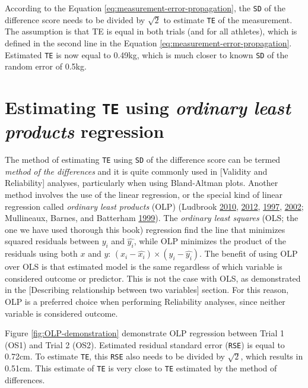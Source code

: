 \documentclass[
]{book}
\begin{document}
According to the Equation \eqref{eq:measurement-error-propagation}, the \texttt{SD} of the difference score needs to be divided by \(\sqrt{2}\) to estimate \texttt{TE} of the measurement. The assumption is that TE is equal in both trials (and for all athletes), which is defined in the second line in the Equation \eqref{eq:measurement-error-propagation}. Estimated \texttt{TE} is now equal to 0.49kg, which is much closer to known \texttt{SD} of the random error of 0.5kg.

\hypertarget{estimating-te-using-ordinary-least-products-regression}{%
\section{\texorpdfstring{Estimating \texttt{TE} using \emph{ordinary least products} regression}{Estimating TE using ordinary least products regression}}\label{estimating-te-using-ordinary-least-products-regression}}

The method of estimating \texttt{TE} using \texttt{SD} of the difference score can be termed \emph{method of the differences} and it is quite commonly used in {[}Validity and Reliability{]} analyses, particularly when using Bland-Altman plots. Another method involves the use of the linear regression, or the special kind of linear regression called \emph{ordinary least products} (OLP) (Ludbrook \protect\hyperlink{ref-ludbrookLinearRegressionAnalysis2010}{2010}, \protect\hyperlink{ref-ludbrookPrimerBiomedicalScientists2012}{2012}, \protect\hyperlink{ref-ludbrookSPECIALARTICLECOMPARING1997}{1997}, \protect\hyperlink{ref-ludbrookStatisticalTechniquesComparing2002}{2002}; Mullineaux, Barnes, and Batterham \protect\hyperlink{ref-mullineauxAssessmentBiasComparing1999}{1999}). The \emph{ordinary least squares} (OLS; the one we have used thorough this book) regression find the line that minimizes squared residuals between \(y_i\) and \(\hat{y_i}\), while OLP minimizes the product of the residuals using both \(x\) and \(y\): \((x_i - \hat{x_i}) \times (y_i - \hat{y_i})\). The benefit of using OLP over OLS is that estimated model is the same regardless of which variable is considered outcome or predictor. This is not the case with OLS, as demonstrated in the {[}Describing relationship between two variables{]} section. For this reason, OLP is a preferred choice when performing Reliability analyses, since neither variable is considered outcome.

Figure \ref{fig:OLP-demonstration} demonstrate OLP regression between Trial 1 (OS1) and Trial 2 (OS2). Estimated residual standard error (\texttt{RSE}) is equal to 0.72cm. To estimate \texttt{TE}, this \texttt{RSE} also needs to be divided by \(\sqrt{2}\), which results in 0.51cm. This estimate of \texttt{TE} is very close to \texttt{TE} estimated by the method of differences.
\end{document}
